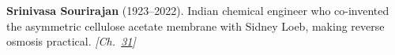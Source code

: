 \textbf{Srinivasa Sourirajan} (1923–2022). Indian chemical engineer who co-invented the asymmetric cellulose acetate membrane with Sidney Loeb, making reverse osmosis practical. \emph{[Ch.~\hyperref[ch:osmosisdebye]{31}]}

